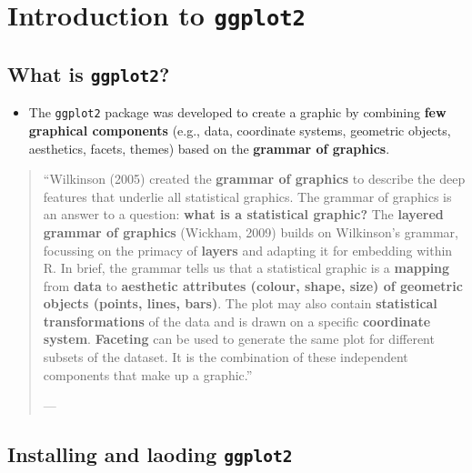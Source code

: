 \documentclass[]{book}
\providecommand{\tightlist}{%
  \setlength{\itemsep}{0pt}\setlength{\parskip}{0pt}}
\begin{document}
\hypertarget{introduction-to-ggplot2}{%
\chapter{\texorpdfstring{Introduction to \texttt{ggplot2}}{Introduction to ggplot2}}\label{introduction-to-ggplot2}}

\hypertarget{what-is-ggplot2}{%
\section{\texorpdfstring{What is \texttt{ggplot2}?}{What is ggplot2?}}\label{what-is-ggplot2}}

\begin{itemize}
\tightlist
\item
  The \texttt{ggplot2} package \citep{ggplot2} was developed to create a graphic by combining \textbf{few graphical components} (e.g., data, coordinate systems, geometric objects, aesthetics, facets, themes) based on the \textbf{grammar of graphics}.
\end{itemize}

\begin{quote}
``Wilkinson (2005) created the \textbf{grammar of graphics} to describe the deep features that underlie all statistical graphics. The grammar of graphics is an answer to a question: \textbf{what is a statistical graphic?} The \textbf{layered grammar of graphics} (Wickham, 2009) builds on Wilkinson's grammar, focussing on the primacy of \textbf{layers} and adapting it for embedding within R. In brief, the grammar tells us that a statistical graphic is a \textbf{mapping} from \textbf{data} to \textbf{aesthetic attributes (colour, shape, size) of geometric objects (points, lines, bars)}. The plot may also contain \textbf{statistical transformations} of the data and is drawn on a specific \textbf{coordinate system}. \textbf{Faceting} can be used to generate the same plot for different subsets of the dataset. It is the combination of these independent components that make up a graphic.''

--- \citet{ggplot2}
\end{quote}

\hypertarget{installing-and-laoding-ggplot2}{%
\section{\texorpdfstring{Installing and laoding \texttt{ggplot2}}{Installing and laoding ggplot2}}\label{installing-and-laoding-ggplot2}}
\end{document}
